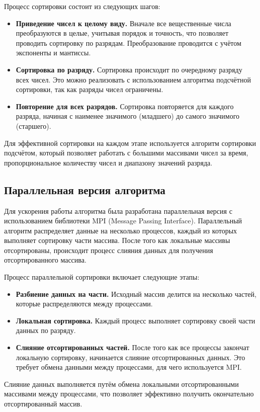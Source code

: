\documentclass[12pt]{article}
\begin{document}
	Процесс сортировки состоит из следующих шагов: \begin{itemize} \item \textbf{Приведение чисел к целому виду.} Вначале все вещественные числа преобразуются в целые, учитывая порядок и точность, что позволяет проводить сортировку по разрядам. Преобразование проводится с учётом экспоненты и мантиссы. \item \textbf{Сортировка по разряду.} Сортировка происходит по очередному разряду всех чисел. Это можно реализовать с использованием алгоритма подсчётной сортировки, так как разряды чисел ограничены. \item \textbf{Повторение для всех разрядов.} Сортировка повторяется для каждого разряда, начиная с наименее значимого (младшего) до самого значимого (старшего). \end{itemize}
	
	Для эффективной сортировки на каждом этапе используется алгоритм сортировки подсчётом, который позволяет работать с большими массивами чисел за время, пропорциональное количеству чисел и диапазону значений разряда.
	
	\subsection*{Параллельная версия алгоритма} Для ускорения работы алгоритма была разработана параллельная версия с использованием библиотеки MPI (Message Passing Interface). Параллельный алгоритм распределяет данные на несколько процессов, каждый из которых выполняет сортировку части массива. После того как локальные массивы отсортированы, происходит процесс слияния данных для получения отсортированного массива.
	
	Процесс параллельной сортировки включает следующие этапы: \begin{itemize} \item \textbf{Разбиение данных на части.} Исходный массив делится на несколько частей, которые распределяются между процессами. \item \textbf{Локальная сортировка.} Каждый процесс выполняет сортировку своей части данных по разряду. \item \textbf{Слияние отсортированных частей.} После того как все процессы закончат локальную сортировку, начинается слияние отсортированных данных. Это требует обмена данными между процессами, для чего используется MPI. \end{itemize}
	
	Слияние данных выполняется путём обмена локальными отсортированными массивами между процессами, что позволяет эффективно получить окончательно отсортированный массив.
	
\end{document}
